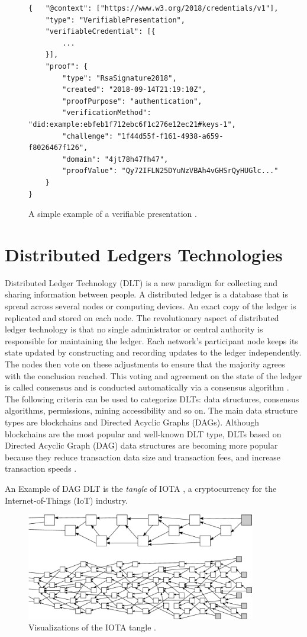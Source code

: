 \begin{figure}[h!]
\begin{lstlisting}[style=json, breaklines=true,frame=single]
{   "@context": ["https://www.w3.org/2018/credentials/v1"],
    "type": "VerifiablePresentation",
    "verifiableCredential": [{
        ...
    }],
    "proof": {
        "type": "RsaSignature2018",
        "created": "2018-09-14T21:19:10Z",
        "proofPurpose": "authentication",
        "verificationMethod": "did:example:ebfeb1f712ebc6f1c276e12ec21#keys-1",
        "challenge": "1f44d55f-f161-4938-a659-f8026467f126",
        "domain": "4jt78h47fh47",
        "proofValue": "Qy72IFLN25DYuNzVBAh4vGHSrQyHUGlc..."
    }
}   
\end{lstlisting}
\caption{A simple example of a verifiable presentation \cite{vcW3C}. \label{vpExample}}
\end{figure}
\section{Distributed Ledgers Technologies}

Distributed Ledger Technology (DLT)  is a new paradigm for collecting and sharing information between people. A distributed ledger is a database that is spread across several nodes or computing devices. An exact copy of the ledger is replicated and stored on each node. The revolutionary aspect of distributed ledger technology is that no single administrator or central authority is responsible for maintaining the ledger. Each network's participant node keeps its state updated by constructing and recording updates to the ledger independently. The nodes then vote on these adjustments to ensure that the majority agrees with the conclusion reached. This voting and agreement on the state of the ledger is called consensus and is conducted automatically via a consensus algorithm \cite{dlt-intro-1}. 
The following criteria can be used to categorize DLTs: data structures, consensus algorithms, permissions, mining accessibility and so on. The main data structure types are blockchains and Directed Acyclic Graphs (DAGs). Although blockchains are the most popular and well-known DLT type,  DLTs based on Directed Acyclic Graph (DAG) data structures are becoming more popular because they reduce transaction data size and transaction fees, and increase transaction speeds \cite{dlt-intro-2}.

An Example of DAG DLT is the \textit{tangle} of IOTA \cite{popov2018tangle}, a cryptocurrency for the Internet-of-Things (IoT) industry.

\begin{figure}[h!]
    \centering
    \includegraphics[width=10cm]{./chapters/images/tangle.png}
    \caption{Visualizations of the IOTA tangle \cite{popov2018tangle}.}
    \label{tangleFigure}
\end{figure}

